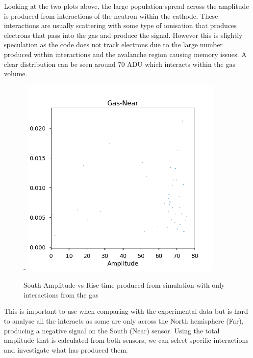 \documentclass[a4paper]{article}
\begin{document}
Looking at the two plots above, the large population spread across the amplitude is produced from interactions of the neutron within the cathode. These interactions are usually scattering with some type of ionisation that produces electrons that pass into the gas and produce the signal. However this is slightly speculation as the code does not track electrons due to the large number produced within interactions and the avalanche region causing memory issues. 
\newline A clear distribution can be seen around 70 ADU which interacts within the gas volume. 
\begin{figure}[H]-
        \centering
        \includegraphics[height=10cm]{steel_achinos_gas_south.png}
        \caption{South Amplitude vs Rise time produced from simulation with only interactions from the gas}
        \label{fig:south2d}
        \end{figure}
\noindent This is important to use when comparing with the experimental data but is hard to analyse all the interacts as some are only across the North hemisphere (Far), producing a negative signal on the South (Near) sensor. Using the total amplitude that is calculated from both sensors, we can select specific interactions and investigate what has produced them.
\end{document}
